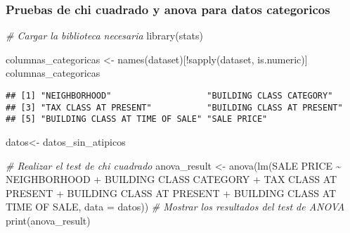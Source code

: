 \documentclass[
]{article}
\newenvironment{Shaded}{\begin{snugshade}}{\end{snugshade}}
\newcommand{\AttributeTok}[1]{\textcolor[rgb]{0.77,0.63,0.00}{#1}}
\newcommand{\CommentTok}[1]{\textcolor[rgb]{0.56,0.35,0.01}{\textit{#1}}}
\newcommand{\FunctionTok}[1]{\textcolor[rgb]{0.00,0.00,0.00}{#1}}
\newcommand{\NormalTok}[1]{#1}
\newcommand{\OtherTok}[1]{\textcolor[rgb]{0.56,0.35,0.01}{#1}}
\newcommand{\SpecialCharTok}[1]{\textcolor[rgb]{0.00,0.00,0.00}{#1}}
\newcommand{\StringTok}[1]{\textcolor[rgb]{0.31,0.60,0.02}{#1}}
\begin{document}
\hypertarget{pruebas-de-chi-cuadrado-y-anova-para-datos-categoricos}{%
\subsubsection{Pruebas de chi cuadrado y anova para datos
categoricos}\label{pruebas-de-chi-cuadrado-y-anova-para-datos-categoricos}}

\begin{Shaded}
\begin{Highlighting}[]
\CommentTok{\# Cargar la biblioteca necesaria}
\FunctionTok{library}\NormalTok{(stats)}

\NormalTok{columnas\_categoricas }\OtherTok{\textless{}{-}} \FunctionTok{names}\NormalTok{(dataset)[}\SpecialCharTok{!}\FunctionTok{sapply}\NormalTok{(dataset, is.numeric)]}
\NormalTok{columnas\_categoricas}
\end{Highlighting}
\end{Shaded}

\begin{verbatim}
## [1] "NEIGHBORHOOD"                   "BUILDING CLASS CATEGORY"       
## [3] "TAX CLASS AT PRESENT"           "BUILDING CLASS AT PRESENT"     
## [5] "BUILDING CLASS AT TIME OF SALE" "SALE PRICE"
\end{verbatim}

\begin{Shaded}
\begin{Highlighting}[]
\NormalTok{datos}\OtherTok{\textless{}{-}}\NormalTok{ datos\_sin\_atipicos}


\CommentTok{\# Realizar el test de chi cuadrado}
\NormalTok{anova\_result }\OtherTok{\textless{}{-}} \FunctionTok{anova}\NormalTok{(}\FunctionTok{lm}\NormalTok{(}\StringTok{\textasciigrave{}}\AttributeTok{SALE PRICE}\StringTok{\textasciigrave{}} \SpecialCharTok{\textasciitilde{}}\NormalTok{ NEIGHBORHOOD }\SpecialCharTok{+}
                           \StringTok{\textasciigrave{}}\AttributeTok{BUILDING CLASS CATEGORY}\StringTok{\textasciigrave{}} \SpecialCharTok{+}
                           \StringTok{\textasciigrave{}}\AttributeTok{TAX CLASS AT PRESENT}\StringTok{\textasciigrave{}} \SpecialCharTok{+}
                           \StringTok{\textasciigrave{}}\AttributeTok{BUILDING CLASS AT PRESENT}\StringTok{\textasciigrave{}} \SpecialCharTok{+}
                           \StringTok{\textasciigrave{}}\AttributeTok{BUILDING CLASS AT TIME OF SALE}\StringTok{\textasciigrave{}}\NormalTok{,}
                         \AttributeTok{data =}\NormalTok{ datos))}
\CommentTok{\# Mostrar los resultados del test de ANOVA}
\FunctionTok{print}\NormalTok{(anova\_result)}
\end{Highlighting}
\end{Shaded}
\end{document}
